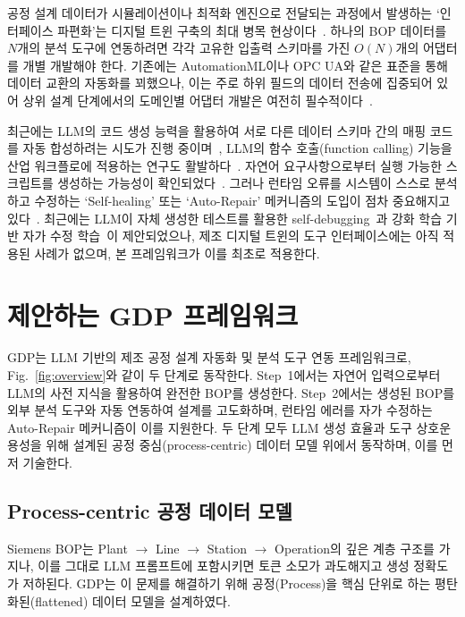 \documentclass[conference]{IEEEtran}
\begin{document}
공정 설계 데이터가 시뮬레이션이나 최적화 엔진으로 전달되는 과정에서 발생하는 `인터페이스 파편화'는 디지털 트윈 구축의 최대 병목 현상이다~\cite{b10}. 하나의 BOP 데이터를 $N$개의 분석 도구에 연동하려면 각각 고유한 입출력 스키마를 가진 $O(N)$개의 어댑터를 개별 개발해야 한다. 기존에는 AutomationML이나 OPC UA와 같은 표준을 통해 데이터 교환의 자동화를 꾀했으나, 이는 주로 하위 필드의 데이터 전송에 집중되어 있어 상위 설계 단계에서의 도메인별 어댑터 개발은 여전히 필수적이다~\cite{b11}.

최근에는 LLM의 코드 생성 능력을 활용하여 서로 다른 데이터 스키마 간의 매핑 코드를 자동 합성하려는 시도가 진행 중이며~\cite{b12}, LLM의 함수 호출(function calling) 기능을 산업 워크플로에 적용하는 연구도 활발하다~\cite{b17}. 자연어 요구사항으로부터 실행 가능한 스크립트를 생성하는 가능성이 확인되었다~\cite{b13}. 그러나 런타임 오류를 시스템이 스스로 분석하고 수정하는 `Self-healing' 또는 `Auto-Repair' 메커니즘의 도입이 점차 중요해지고 있다~\cite{b14}. 최근에는 LLM이 자체 생성한 테스트를 활용한 self-debugging~\cite{b18}과 강화 학습 기반 자가 수정 학습~\cite{b19}이 제안되었으나, 제조 디지털 트윈의 도구 인터페이스에는 아직 적용된 사례가 없으며, 본 프레임워크가 이를 최초로 적용한다.

\section{제안하는 GDP 프레임워크}

GDP는 LLM 기반의 제조 공정 설계 자동화 및 분석 도구 연동 프레임워크로, Fig.~\ref{fig:overview}와 같이 두 단계로 동작한다. Step~1에서는 자연어 입력으로부터 LLM의 사전 지식을 활용하여 완전한 BOP를 생성한다. Step~2에서는 생성된 BOP를 외부 분석 도구와 자동 연동하여 설계를 고도화하며, 런타임 에러를 자가 수정하는 Auto-Repair 메커니즘이 이를 지원한다. 두 단계 모두 LLM 생성 효율과 도구 상호운용성을 위해 설계된 공정 중심(process-centric) 데이터 모델 위에서 동작하며, 이를 먼저 기술한다.

\subsection{Process-centric 공정 데이터 모델}

Siemens BOP는 Plant $\rightarrow$ Line $\rightarrow$ Station $\rightarrow$ Operation의 깊은 계층 구조를 가지나, 이를 그대로 LLM 프롬프트에 포함시키면 토큰 소모가 과도해지고 생성 정확도가 저하된다. GDP는 이 문제를 해결하기 위해 공정(Process)을 핵심 단위로 하는 평탄화된(flattened) 데이터 모델을 설계하였다.
\end{document}
